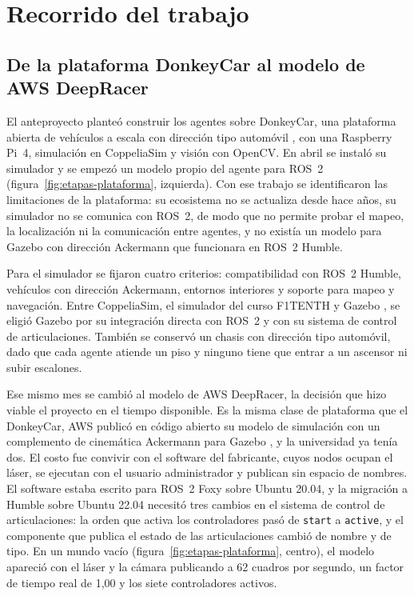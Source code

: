 \section{Recorrido del trabajo}
\label{sec:recorrido}

\subsection{De la plataforma DonkeyCar al modelo de AWS DeepRacer}
\label{sec:donkeycar}

El anteproyecto planteó construir los agentes sobre DonkeyCar, una plataforma abierta de vehículos a escala con dirección tipo automóvil \autocite{donkeycar}, con una Raspberry Pi~4, simulación en CoppeliaSim y visión con OpenCV. En abril se instaló su simulador y se empezó un modelo propio del agente para ROS~2 (figura~\ref{fig:etapas-plataforma}, izquierda). Con ese trabajo se identificaron las limitaciones de la plataforma: su ecosistema no se actualiza desde hace años, su simulador no se comunica con ROS~2, de modo que no permite probar el mapeo, la localización ni la comunicación entre agentes, y no existía un modelo para Gazebo con dirección Ackermann que funcionara en ROS~2 Humble.

Para el simulador se fijaron cuatro criterios: compatibilidad con ROS~2 Humble, vehículos con dirección Ackermann, entornos interiores y soporte para mapeo y navegación. Entre CoppeliaSim, el simulador del curso F1TENTH y Gazebo \autocite{koenig2004gazebo}, se eligió Gazebo por su integración directa con ROS~2 y con su sistema de control de articulaciones. También se conservó un chasis con dirección tipo automóvil, dado que cada agente atiende un piso y ninguno tiene que entrar a un ascensor ni subir escalones.

Ese mismo mes se cambió al modelo de AWS DeepRacer, la decisión que hizo viable el proyecto en el tiempo disponible. Es la misma clase de plataforma que el DonkeyCar, AWS publicó en código abierto su modelo de simulación con un complemento de cinemática Ackermann para Gazebo \autocite{awsdeepracer2021}, y la universidad ya tenía dos. El costo fue convivir con el software del fabricante, cuyos nodos ocupan el láser, se ejecutan con el usuario administrador y publican sin espacio de nombres. El software estaba escrito para ROS~2 Foxy sobre Ubuntu 20.04, y la migración a Humble sobre Ubuntu 22.04 necesitó tres cambios en el sistema de control de articulaciones: la orden que activa los controladores pasó de \texttt{start} a \texttt{active}, y el componente que publica el estado de las articulaciones cambió de nombre y de tipo. En un mundo vacío (figura~\ref{fig:etapas-plataforma}, centro), el modelo apareció con el láser y la cámara publicando a 62 cuadros por segundo, un factor de tiempo real de 1,00 y los siete controladores activos.

